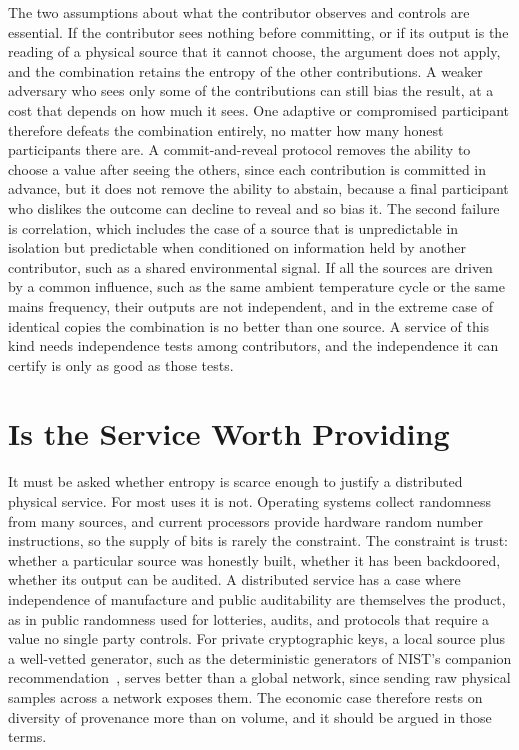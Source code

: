 The two assumptions about what the contributor observes and controls are essential. If the contributor sees nothing before committing, or if its output is the reading of a physical source that it cannot choose, the argument does not apply, and the combination retains the entropy of the other contributions. A weaker adversary who sees only some of the contributions can still bias the result, at a cost that depends on how much it sees. One adaptive or compromised participant therefore defeats the combination entirely, no matter how many honest participants there are. A commit-and-reveal protocol removes the ability to choose a value after seeing the others, since each contribution is committed in advance, but it does not remove the ability to abstain, because a final participant who dislikes the outcome can decline to reveal and so bias it. The second failure is correlation, which includes the case of a source that is unpredictable in isolation but predictable when conditioned on information held by another contributor, such as a shared environmental signal. If all the sources are driven by a common influence, such as the same ambient temperature cycle or the same mains frequency, their outputs are not independent, and in the extreme case of identical copies the combination is no better than one source. A service of this kind needs independence tests among contributors, and the independence it can certify is only as good as those tests.

\section{Is the Service Worth Providing}

It must be asked whether entropy is scarce enough to justify a distributed physical service. For most uses it is not. Operating systems collect randomness from many sources, and current processors provide hardware random number instructions, so the supply of bits is rarely the constraint. The constraint is trust: whether a particular source was honestly built, whether it has been backdoored, whether its output can be audited. A distributed service has a case where independence of manufacture and public auditability are themselves the product, as in public randomness used for lotteries, audits, and protocols that require a value no single party controls. For private cryptographic keys, a local source plus a well-vetted generator, such as the deterministic generators of NIST's companion recommendation~\cite{barker2015}, serves better than a global network, since sending raw physical samples across a network exposes them. The economic case therefore rests on diversity of provenance more than on volume, and it should be argued in those terms.

